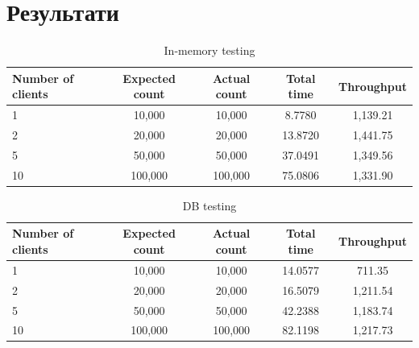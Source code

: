 \documentclass[12pt,a4paper]{article}
\begin{document}
\section{Результати}
\begin{table}[h!]
  \centering
  \caption{In-memory testing}
  \label{tab:in_memory_testing}
  \begin{tabular}{lcccc}
    \toprule
    \textbf{Number of clients} & \textbf{Expected count} & \textbf{Actual count} & \textbf{Total time} & \textbf{Throughput} \\
    \midrule
    1 & 10,000 & 10,000 & 8.7780 & 1,139.21 \\
    2 & 20,000 & 20,000 & 13.8720 & 1,441.75 \\
    5 & 50,000 & 50,000 & 37.0491 & 1,349.56 \\
    10 & 100,000 & 100,000 & 75.0806 & 1,331.90 \\
    \bottomrule
  \end{tabular}
\end{table}
\begin{table}[h!]
  \centering
  \caption{DB testing}
  \label{tab:db_testing}
  \begin{tabular}{lcccc}
    \toprule
    \textbf{Number of clients} & \textbf{Expected count} & \textbf{Actual count} & \textbf{Total time} & \textbf{Throughput} \\
    \midrule
    1 & 10,000 & 10,000 & 14.0577 & 711.35 \\
    2 & 20,000 & 20,000 & 16.5079 & 1,211.54 \\
    5 & 50,000 & 50,000 & 42.2388 & 1,183.74 \\
    10 & 100,000 & 100,000 & 82.1198 & 1,217.73 \\
    \bottomrule
  \end{tabular}
\end{table}

\newpage
\end{document}

